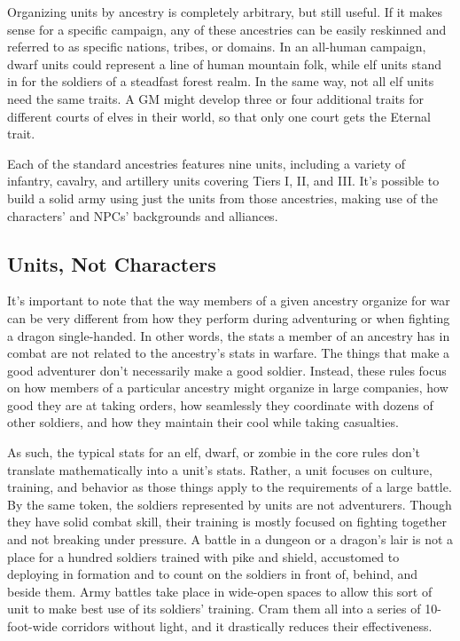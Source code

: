 \documentclass[10pt,a4paper,twoside,bg=print,twocolumn,openany,nodeprecatedcode]{dndbook}
\begin{document}
Organizing units by ancestry is completely arbitrary, but still useful. If it makes sense for a specific campaign, any of these ancestries can be easily reskinned and referred to as specific nations, tribes, or domains. In an all-human campaign, dwarf units could represent a line of human mountain folk, while elf units stand in for the soldiers of a steadfast forest realm. In the same way, not all elf units need the same traits. A GM might develop three or four additional traits for different courts of elves in their world, so that only one court gets the Eternal trait.

Each of the standard ancestries features nine units, including a variety of infantry, cavalry, and artillery units covering Tiers I, II, and III. It's possible to build a solid army using just the units from those ancestries, making use of the characters' and NPCs' backgrounds and alliances.

\subsection{Units, Not Characters}
It's important to note that the way members of a given ancestry organize for war can be very different from how they perform during adventuring or when fighting a dragon single-handed. In other words, the stats a member of an ancestry has in combat are not related to the ancestry's stats in warfare. The things that make a good adventurer don't necessarily make a good soldier. Instead, these rules focus on how members of a particular ancestry might organize in large companies, how good they are at taking orders, how seamlessly they coordinate with dozens of other soldiers, and how they maintain their cool while taking casualties.

As such, the typical stats for an elf, dwarf, or zombie in the core rules don't translate mathematically into a unit's stats. Rather, a unit focuses on culture, training, and behavior as those things apply to the requirements of a large battle. By the same token, the soldiers represented by units are not adventurers. Though they have solid combat skill, their training is mostly focused on fighting together and not breaking under pressure. A battle in a dungeon or a dragon's lair is not a place for a hundred soldiers trained with pike and shield, accustomed to deploying in formation and to count on the soldiers in front of, behind, and beside them. Army battles take place in wide-open spaces to allow this sort of unit to make best use of its soldiers' training. Cram them all into a series of 10-foot-wide corridors without light, and it drastically reduces their effectiveness.
\end{document}
